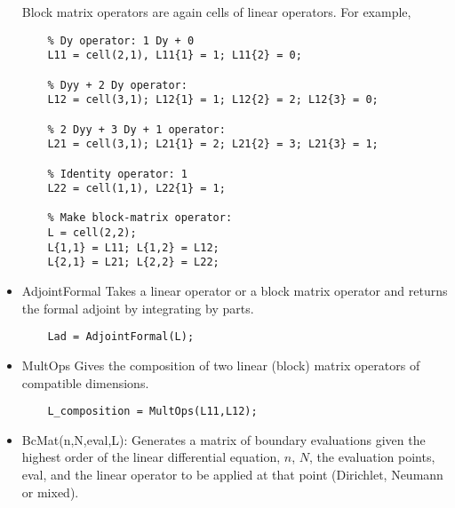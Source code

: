 \documentclass[%
secnumarabic,%
 amssymb, amsmath,%
 aps,prf,superscriptaddress,longbibliography
frontmatterverbose,
]{revtex4-2}
\begin{document}
\begin{itemize}
  Block matrix operators are again cells of linear operators. For example, 
  \begin{lstlisting}
    % Dy operator: 1 Dy + 0
    L11 = cell(2,1), L11{1} = 1; L11{2} = 0;

    % Dyy + 2 Dy operator:
    L12 = cell(3,1); L12{1} = 1; L12{2} = 2; L12{3} = 0;

    % 2 Dyy + 3 Dy + 1 operator:
    L21 = cell(3,1); L21{1} = 2; L21{2} = 3; L21{3} = 1;

    % Identity operator: 1
    L22 = cell(1,1), L22{1} = 1;

    % Make block-matrix operator:
    L = cell(2,2);
    L{1,1} = L11; L{1,2} = L12;
    L{2,1} = L21; L{2,2} = L22;
  \end{lstlisting}
  \item {\sf AdjointFormal} Takes a linear operator or a block matrix operator and returns the formal adjoint by integrating by parts.
  \begin{lstlisting}
    Lad = AdjointFormal(L);
  \end{lstlisting}
  \item {\sf MultOps} Gives the composition of two linear (block) matrix operators of compatible dimensions.
  \begin{lstlisting}
    L_composition = MultOps(L11,L12);
  \end{lstlisting}
  \item \textsf{BcMat(n,N,eval,L)}: Generates a matrix of boundary evaluations given the highest order of the linear differential equation, $n$, $N$, the evaluation points, \textsf{eval}, and the linear operator to be applied at that point (Dirichlet, Neumann or mixed). %
  
\end{itemize}
\end{document}
